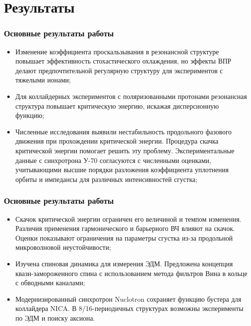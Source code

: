 \section{Результаты}
\begin{frame}
	\frametitle{Основные результаты работы}
	\begin{itemize}
		\item Изменение коэффициента проскальзывания в резонансной структуре повышает эффективность стохастического охлаждения, но эффекты ВПР делают предпочтительной регулярную структуру для экспериментов с тяжелыми ионами;
		\vspace{1em}
		\item Для коллайдерных экспериментов с поляризованными протонами резонансная структура повышает критическую энергию, искажая дисперсионную функцию;
		\vspace{1em}
		\item Численные исследования выявили нестабильность продольного фазового движения при прохождении критической энергии. Процедура скачка критической энергии помогает решить эту проблему. Экспериментальные данные с синхротрона У-70 согласуются с численными оценками, учитывающими высшие порядки разложения коэффициента уплотнения орбиты и импедансы для различных интенсивностей сгустка;
	\end{itemize}
\end{frame}
\begin{frame}
	\frametitle{Основные результаты работы}
	\begin{itemize}
		\item Скачок критической энергии ограничен его величиной и темпом изменения. Различия применения гармонического и барьерного ВЧ влияют на скачок. Оценки показывают ограничения на параметры сгустка из-за продольной микроволновой неустойчивости;
		\vspace{1em}
		\item Изучена спиновая динамика для измерения ЭДМ. Предложена концепция квази-замороженного спина с использованием метода фильтров Вина в кольце с обводными каналами;
		\vspace{1em}
		\item Модернизированный синхротрон Nuclotron сохраняет функцию бустера для коллайдера NICA. В 8/16-периодичных структурах возможны эксперименты по ЭДМ и поиску аксиона.
	\end{itemize}
\end{frame}
